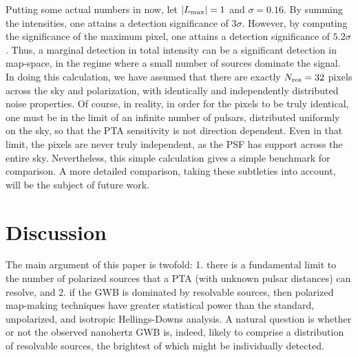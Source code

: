 \documentclass[%
 reprint,
nofootinbib,
 amsmath,amssymb,
 aps,
]{revtex4-2}
\begin{document}
Putting some actual numbers in now, let $|L_{\rm max}|=1$ and $\sigma=0.16$. By summing the intensities, one attains a detection significance of $3 \sigma$. However, by computing the significance of the maximum pixel, one attains a detection significance of $5.2 \sigma$. Thus, a marginal detection in total intensity can be a significant detection in map-space, in the regime where a small number of sources dominate the signal. In doing this calculation, we have assumed that there are exactly $N_{\rm res} = 32$ pixels across the sky and polarization, with identically and independently distributed noise properties. Of course, in reality, in order for the pixels to be truly identical, one must be in the limit of an infinite number of pulsars, distributed uniformly on the sky, so that the PTA sensitivity is not direction dependent. Even in that limit, the pixels are never truly independent, as the PSF has support across the entire sky. Nevertheless, this simple calculation gives a simple benchmark for comparison. A more detailed comparison, taking these subtleties into account, will be the subject of future work.

\section{\label{sec:discussion}Discussion}
 
The main argument of this paper is twofold: 1. there is a fundamental limit to the number of polarized sources that a PTA (with unknown pulsar distances) can resolve, and 2. if the GWB is dominated by resolvable sources, then polarized map-making techniques have greater statistical power than the standard, unpolarized, and isotropic Hellings-Downs analysis. A natural question is whether or not the observed nanohertz GWB is, indeed, likely to comprise a distribution of resolvable sources, the brightest of which might be individually detected.
\end{document}
